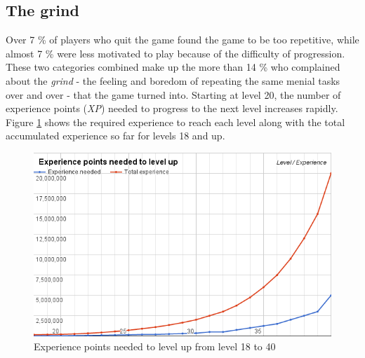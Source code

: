 \subsection{The grind}
\label{sec:quitting-reasons-the-grind}
Over 7 \% of players who quit the game found the game to be too repetitive, while almost 7 \% were less motivated to play because of the difficulty of progression. These two categories combined make up the more than 14 \% who complained about the \emph{grind} - the feeling and boredom of repeating the same menial tasks over and over - that the game turned into. Starting at level 20, the number of experience points (\emph{XP}) needed to progress to the next level increases rapidly. Figure \ref{fig:experience-per-level} shows the required experience to reach each level along with the total accumulated experience so far for levels 18 and up.

\begin{figure}[h]
	\centering
	\includegraphics[width=\textwidth]{Figures/experience-per-level}
	\caption{Experience points needed to level up from level 18 to 40}
	\label{fig:experience-per-level}
\end{figure}

